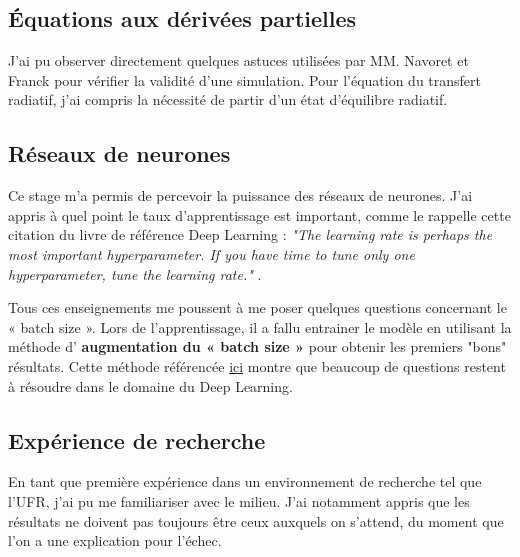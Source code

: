 \subsection{Équations aux dérivées partielles}
J'ai pu observer directement quelques astuces utilisées par MM. Navoret et Franck pour vérifier la validité d'une simulation. Pour l'équation du transfert radiatif, j'ai compris la nécessité de partir d'un état d'équilibre radiatif.

\subsection{Réseaux de neurones}
Ce stage m'a permis de percevoir la puissance des réseaux de neurones. J'ai appris à quel point le taux d'apprentissage est important, comme le rappelle cette citation du livre de référence Deep Learning : \textit{"The learning rate is perhaps the most important hyperparameter. If you have time to tune only one hyperparameter, tune the learning rate."} \parencite[417]{Reference5}. 

Tous ces enseignements me poussent à me poser quelques questions concernant le « batch size ». Lors de l'apprentissage, il a fallu entrainer le modèle en utilisant la méthode d' \textbf{augmentation du « batch size »} pour obtenir les premiers "bons" résultats. Cette méthode référencée \href{https://arxiv.org/pdf/1711.00489.pdf}{ici} montre que beaucoup de questions restent à résoudre dans le domaine du Deep Learning.

\subsection{Expérience de recherche}
En tant que première expérience dans un environnement de recherche tel que l'UFR, j'ai pu me familiariser avec le milieu. J'ai notamment appris que les résultats ne doivent pas toujours être ceux auxquels on s'attend, du moment que l'on a une explication pour l'échec.

